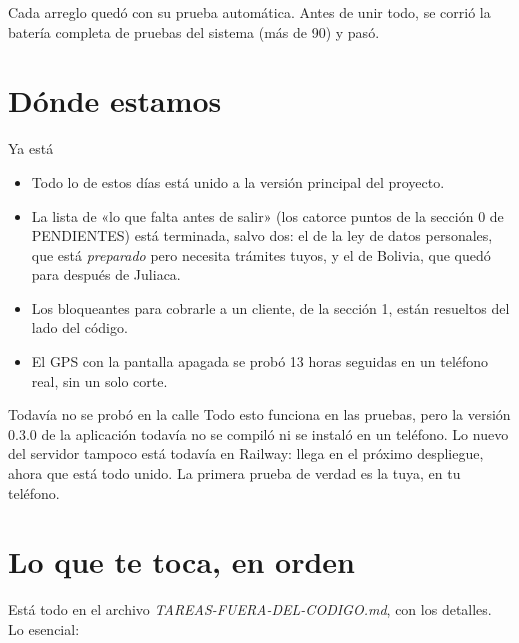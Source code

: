\documentclass[12pt,a4paper]{article}
\begin{document}
Cada arreglo quedó con su prueba automática. Antes de unir todo, se corrió la
batería completa de pruebas del sistema (más de 90) y pasó.

\section{Dónde estamos}

\begin{recuadro}{Ya está}
\begin{itemize}[leftmargin=1.2em]
  \item Todo lo de estos días está unido a la versión principal del proyecto.
  \item La lista de «lo que falta antes de salir» (los catorce puntos de la
  sección 0 de PENDIENTES) está terminada, salvo dos: el de la ley de datos
  personales, que está \emph{preparado} pero necesita trámites tuyos, y el
  de Bolivia, que quedó para después de Juliaca.
  \item Los bloqueantes para cobrarle a un cliente, de la sección 1, están
  resueltos del lado del código.
  \item El GPS con la pantalla apagada se probó 13 horas seguidas en un
  teléfono real, sin un solo corte.
\end{itemize}
\end{recuadro}

\begin{atencion}{Todavía no se probó en la calle}
Todo esto funciona en las pruebas, pero la versión 0.3.0 de la aplicación
todavía no se compiló ni se instaló en un teléfono. Lo nuevo del servidor
tampoco está todavía en Railway: llega en el próximo despliegue, ahora que
está todo unido. La primera prueba de verdad es la tuya, en tu teléfono.
\end{atencion}

\section{Lo que te toca, en orden}

Está todo en el archivo \emph{TAREAS-FUERA-DEL-CODIGO.md}, con los detalles.
Lo esencial:
\end{document}
